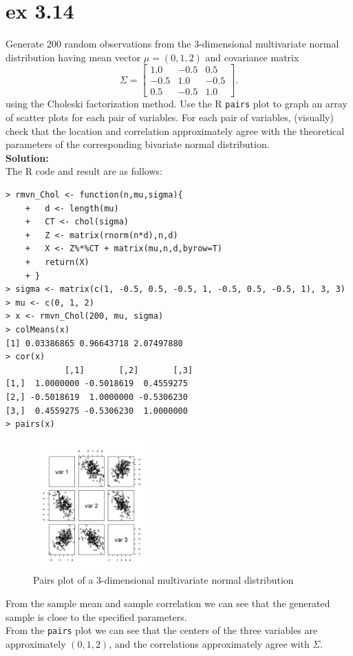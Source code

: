 \documentclass[UTF8]{ctexart}
\begin{document}
\section{ex 3.14}
Generate 200 random observations from the 3-dimensional multivariate normal 
distribution having mean vector $\mu = (0, 1, 2)$ and covariance matrix
\begin{equation*}
    \Sigma = \begin{bmatrix}
        1.0 & -0.5 & 0.5 \\
        -0.5 & 1.0 & -0.5 \\
        0.5 & -0.5 & 1.0
    \end{bmatrix}.
\end{equation*}
using the Choleski factorization method. Use the R \texttt{pairs} plot to graph an
array of scatter plots for each pair of variables. For each pair of variables,
(visually) check that the location and correlation approximately agree with
the theoretical parameters of the corresponding bivariate normal distribution.\\
\textbf{Solution:}\\
The R code and result are as follows:
\begin{lstlisting}
> rmvn_Chol <- function(n,mu,sigma){
    +   d <- length(mu)
    +   CT <- chol(sigma)
    +   Z <- matrix(rnorm(n*d),n,d)
    +   X <- Z%*%CT + matrix(mu,n,d,byrow=T)
    +   return(X)
    + }
> sigma <- matrix(c(1, -0.5, 0.5, -0.5, 1, -0.5, 0.5, -0.5, 1), 3, 3)
> mu <- c(0, 1, 2)
> x <- rmvn_Chol(200, mu, sigma)
> colMeans(x)
[1] 0.03386865 0.96643718 2.07497880
> cor(x)
            [,1]       [,2]       [,3]
[1,]  1.0000000 -0.5018619  0.4559275
[2,] -0.5018619  1.0000000 -0.5306230
[3,]  0.4559275 -0.5306230  1.0000000
> pairs(x)
\end{lstlisting}
\begin{figure}[H]
    \centering
    \includegraphics[width=0.4\textwidth]{ex3-14.png}
    \caption{Pairs plot of a 3-dimensional multivariate normal distribution}
\end{figure}
From the sample mean and sample correlation we can see that the generated sample is close to the specified parameters.\\
From the \texttt{pairs} plot we can see that the centers of the three variables are approximately $(0, 1, 2)$, and the correlations approximately agree with $\Sigma$.\\
\end{document}
